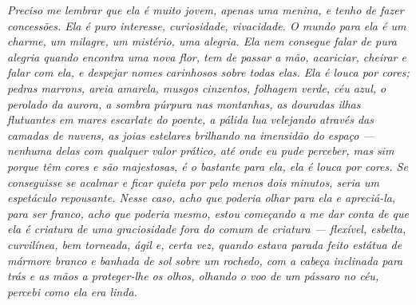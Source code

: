 {\itshape
Preciso me lembrar que ela é muito jovem, apenas uma menina, e tenho de fazer
concessões. Ela é puro interesse, curiosidade, vivacidade. O mundo para ela é
um charme, um milagre, um mistério, uma alegria. Ela nem consegue falar de
pura alegria quando encontra uma nova flor, tem de passar a mão,
acariciar, cheirar e falar com ela, e despejar nomes carinhosos sobre todas elas. Ela é
louca por cores; pedras marrons, areia amarela, musgos cinzentos, folhagem
verde, céu azul, o perolado da aurora, a sombra púrpura nas montanhas, as
douradas ilhas flutuantes em mares escarlate do poente, a pálida lua
velejando através das camadas de nuvens, as joias estelares
brilhando na imensidão do espaço --- nenhuma delas com qualquer valor prático,
até onde eu pude perceber, mas sim porque têm cores e são majestosas, é o bastante para ela, 
ela é louca por cores. Se conseguisse se acalmar e ficar
quieta por pelo menos dois minutos, seria um espetáculo
repousante. Nesse caso, acho que poderia olhar para ela e apreciá-la, para ser franco, acho
que poderia mesmo, estou começando a me dar conta de que ela é criatura de uma graciosidade fora do comum
de criatura --- flexível, esbelta, curvilínea, bem torneada, ágil e, certa vez,
quando estava parada feito estátua de mármore branco e banhada de sol sobre
um rochedo, com a cabeça inclinada para trás e as mãos a proteger-lhe
os olhos, olhando o voo de um pássaro no céu, percebi como ela era linda.
}\par

